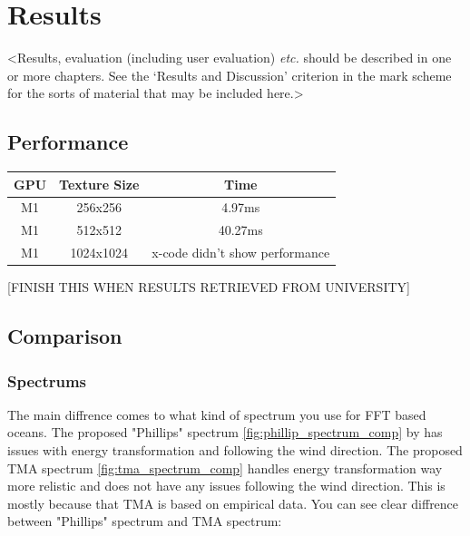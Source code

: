 \justifying
\chapter{Results}
\label{chapter3}

<Results, evaluation (including user evaluation) {\em etc.} should be described in one or more chapters. See the `Results and Discussion' criterion in the mark scheme for the sorts of material that may be included here.>
\section{Performance}

\begin{table}[h]
    \centering
    \begin{tabular}{|c|c|c|}
        \hline
        \textbf{GPU} & \textbf{Texture Size} & \textbf{Time} \\
        \hline
        M1 & 256x256 & 4.97ms \\
        \hline
        M1 & 512x512 & 40.27ms \\
        \hline
        M1 & 1024x1024 & x-code didn't show performance \\
        \hline
    \end{tabular}
\end{table}

[FINISH THIS WHEN RESULTS RETRIEVED FROM UNIVERSITY]

\section{Comparison} 

\subsection{Spectrums}
The main diffrence comes to what kind of spectrum you use for FFT based oceans. The proposed "Phillips" spectrum \ref{fig:phillip_spectrum_comp} by \cite[J. Tessendorf]{tessendorf2001} has issues with energy transformation and following the wind direction. 
The proposed TMA spectrum \ref{fig:tma_spectrum_comp} handles energy transformation way more relistic and does not have any issues following the wind direction. This is mostly because that TMA is based on empirical data.
You can see clear diffrence between "Phillips" spectrum and TMA spectrum:

